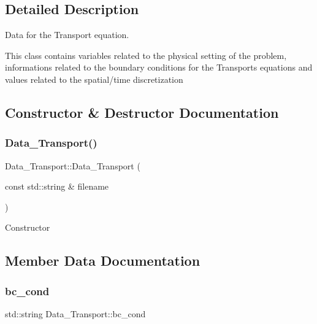 \subsection{Detailed Description}
Data for the Transport equation. 

This class contains variables related to the physical setting of the problem, informations related to the boundary conditions for the Transport\textquotesingle{}s equations and values related to the spatial/time discretization 

\subsection{Constructor \& Destructor Documentation}
\mbox{\label{classData__Transport_a32766e6d540e05d518c9de22c00dc290}} 
\subsubsection{\texorpdfstring{Data\+\_\+\+Transport()}{Data\_Transport()}}
{\footnotesize\ttfamily Data\+\_\+\+Transport\+::\+Data\+\_\+\+Transport (\begin{DoxyParamCaption}\item[{const std\+::string \&}]{filename }\end{DoxyParamCaption})\hspace{0.3cm}{\ttfamily [explicit]}}

Constructor 

\subsection{Member Data Documentation}
\mbox{\label{classData__Transport_a72f6bee03d1aa06b11004640e3d60ec1}} 
\subsubsection{\texorpdfstring{bc\+\_\+cond}{bc\_cond}}
{\footnotesize\ttfamily std\+::string Data\+\_\+\+Transport\+::bc\+\_\+cond}

